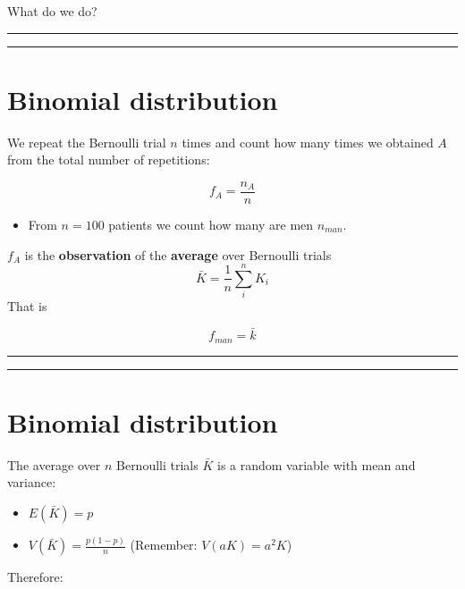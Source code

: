 \documentclass[
]{book}
\providecommand{\tightlist}{%
  \setlength{\itemsep}{0pt}\setlength{\parskip}{0pt}}
\begin{document}
What do we do?

\begin{center}\rule{0.5\linewidth}{0.5pt}\end{center}

\begin{center}\rule{0.5\linewidth}{0.5pt}\end{center}

\hypertarget{binomial-distribution-4}{%
\section{Binomial distribution}\label{binomial-distribution-4}}

We repeat the Bernoulli trial \(n\) times and count how many times we obtained \(A\) from the total number of repetitions:

\[f_A=\frac{n_A}{n}\]

\begin{itemize}
\tightlist
\item
  From \(n=100\) patients we count how many are men \(n_{man}\).
\end{itemize}

\(f_A\) is the \textbf{observation} of the \textbf{average} over Bernoulli trials \[\bar{K}=\frac{1}{n}\sum_i^n K_i\]
That is

\[f_{man}=\bar{k}\]

\begin{center}\rule{0.5\linewidth}{0.5pt}\end{center}

\begin{center}\rule{0.5\linewidth}{0.5pt}\end{center}

\hypertarget{binomial-distribution-5}{%
\section{Binomial distribution}\label{binomial-distribution-5}}

The average over \(n\) Bernoulli trials \(\bar{K}\) is a random variable with mean and variance:

\begin{itemize}
\tightlist
\item
  \(E(\bar{K})=p\)
\item
  \(V(\bar{K})=\frac{p(1-p)}{n}\) (Remember: \(V(aK)=a^2K\))
\end{itemize}

Therefore:
\end{document}
